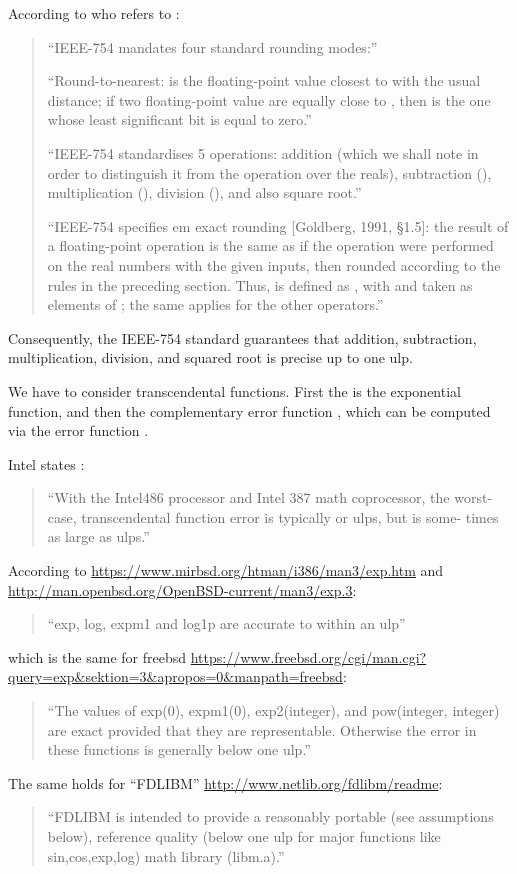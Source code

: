 \documentclass{article}
\begin{document}
According to \citep{Muller:05} who refers to \citep{Goldberg:91}:
\begin{quote}
``IEEE-754 mandates four standard rounding modes:''

``Round-to-nearest:  is the floating-point value closest to  with the
usual distance; if two floating-point value are equally close to , then 
is the one whose least significant bit is equal to zero.''

``IEEE-754 standardises 5 operations: addition (which we shall note  in order to
distinguish it from the operation over the reals), subtraction (), multiplication
(), division (), and also square root.''

``IEEE-754 specifies {em exact rounding} [Goldberg, 1991, \S1.5]: the result of a
floating-point operation is the same as if the operation were performed on the
real numbers with the given inputs, then rounded according to the rules in the
preceding section. Thus,  is defined as , with  and  taken as
elements of ; the same applies for the other operators.''
\end{quote}
Consequently, the IEEE-754 standard guarantees that addition,
subtraction, multiplication, division, and squared root is precise up
to one ulp.

We have to consider transcendental functions. First the is the
exponential function, and then the complementary error
function ,
which can be computed via the error function .

Intel states \citep{Muller:05}:
\begin{quote}
``With the Intel486 processor and Intel 387 math coprocessor, the worst-
case, transcendental function error is typically  or  ulps, but is some-
times as large as  ulps.''
\end{quote}


According to \url{https://www.mirbsd.org/htman/i386/man3/exp.htm} and 
\url{http://man.openbsd.org/OpenBSD-current/man3/exp.3}:
\begin{quote}
``exp, log, expm1 and log1p are accurate to within an ulp''
\end{quote}
which is the same for freebsd \url{https://www.freebsd.org/cgi/man.cgi?query=exp&sektion=3&apropos=0&manpath=freebsd}:
\begin{quote}
``The values of exp(0), expm1(0), exp2(integer), and pow(integer, integer)
are exact provided that they are representable.  Otherwise the error in
these functions is generally below one ulp.''
\end{quote}
The same holds for ``FDLIBM'' \url{http://www.netlib.org/fdlibm/readme}:
\begin{quote}
``FDLIBM is intended to provide a reasonably portable (see
assumptions below), reference quality (below one ulp for
major functions like sin,cos,exp,log) math library
(libm.a).''
\end{quote}
\end{document}
